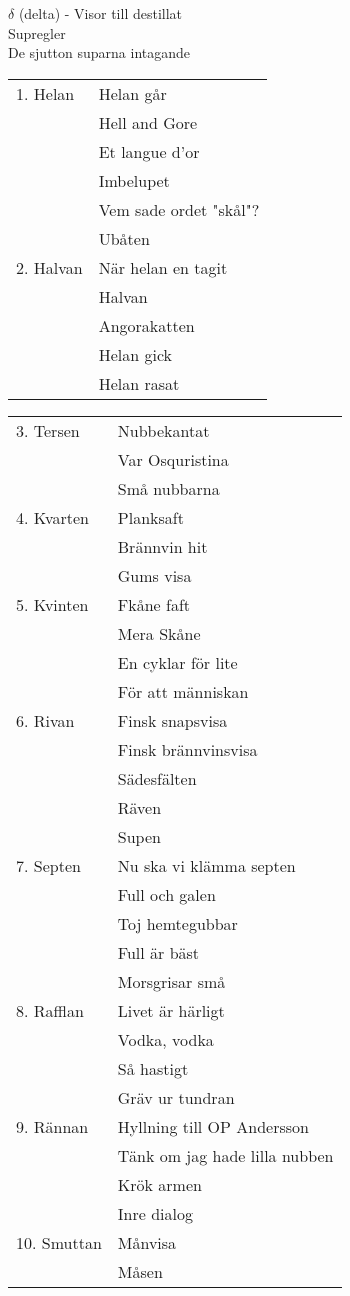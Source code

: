 \documentclass[a6paper,10pt]{article}
\begin{document}
\noindent
\Large $\delta$ (delta) - Visor till destillat
\vspace{3pt}\\
\normalsize   Supregler
\vspace{3pt}\\
    De sjutton suparna intagande
\vspace{-7pt}
\begin{table}[!ht]
\begin{tabularx}{0.8\textwidth}{l X}
1. Helan&Helan går\\
&Hell and Gore\\
&Et langue d'or\\
&Imbelupet\\
&Vem sade ordet "skål"?\\
&Ubåten\\
2. Halvan&När helan en tagit\\
&Halvan\\
&Angorakatten\\
&Helan gick\\
&Helan rasat\\
\end{tabularx}
\end{table}
\begin{table}[!ht]
\begin{tabularx}{0.9\textwidth}{l X}
3. Tersen&Nubbekantat\\
 &Var Osquristina\\
 &Små nubbarna\\
4. Kvarten&Planksaft\\
 &Brännvin hit\\
 &Gums visa\\
5. Kvinten&Fkåne faft\\
 &Mera Skåne\\
 &En cyklar för lite\\
 &För att människan\\
6. Rivan&Finsk snapsvisa\\
 &Finsk brännvinsvisa\\
 &Sädesfälten\\
 &Räven\\
 &Supen\\
7. Septen&Nu ska vi klämma septen\\
 &Full och galen\\
 &Toj hemtegubbar\\
 &Full är bäst\\
 &Morsgrisar små\\
8. Rafflan&Livet är härligt\\
 &Vodka, vodka\\
 &Så hastigt\\
 &Gräv ur tundran\\
9. Rännan&Hyllning till OP Andersson\\
&Tänk om jag hade lilla nubben\\
&Krök armen\\
&Inre dialog\\
10. Smuttan&Månvisa\\
&Måsen
\end{tabularx}
\end{table}
\end{document}
